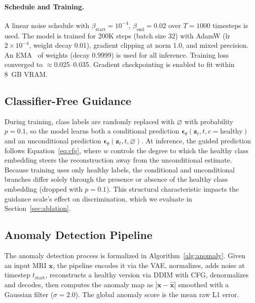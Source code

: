 \documentclass[graybox]{svmult}
\begin{document}
\paragraph{Schedule and Training.} A linear noise schedule with $\beta_{\text{start}} = 10^{-4}$, $\beta_{\text{end}} = 0.02$ over $T = 1000$ timesteps is used. The model is trained for 200K steps (batch size 32) with AdamW (lr $2 \times 10^{-4}$, weight decay 0.01), gradient clipping at norm 1.0, and mixed precision. An EMA~\cite{polyak1992acceleration} of weights (decay 0.9999) is used for all inference. Training loss converged to $\approx$0.025--0.035. Gradient checkpointing is enabled to fit within 8~GB VRAM.

\subsection{Classifier-Free Guidance}
\label{sec:cfg}

During training, class labels are randomly replaced with $\varnothing$ with probability $p = 0.1$, so the model learns both a conditional prediction $\boldsymbol{\epsilon}_\theta(\mathbf{z}_t, t, c{=}\text{healthy})$ and an unconditional prediction $\boldsymbol{\epsilon}_\theta(\mathbf{z}_t, t, \varnothing)$. At inference, the guided prediction follows Equation~\ref{eq:cfg}, where $w$ controls the degree to which the healthy class embedding steers the reconstruction away from the unconditional estimate. Because training uses only healthy labels, the conditional and unconditional branches differ solely through the presence or absence of the healthy class embedding (dropped with $p = 0.1$). This structural characteristic impacts the guidance scale's effect on discrimination, which we evaluate in Section~\ref{sec:ablation}.

\subsection{Anomaly Detection Pipeline}
\label{sec:anomaly_pipeline}

The anomaly detection process is formalized in Algorithm~\ref{alg:anomaly}. Given an input MRI $\mathbf{x}$, the pipeline encodes it via the VAE, normalizes, adds noise at timestep $t_{\text{start}}$, reconstructs a healthy version via DDIM with CFG, denormalizes and decodes, then computes the anomaly map as $|\mathbf{x} - \hat{\mathbf{x}}|$ smoothed with a Gaussian filter ($\sigma = 2.0$). The global anomaly score is the mean raw L1 error.
\end{document}

